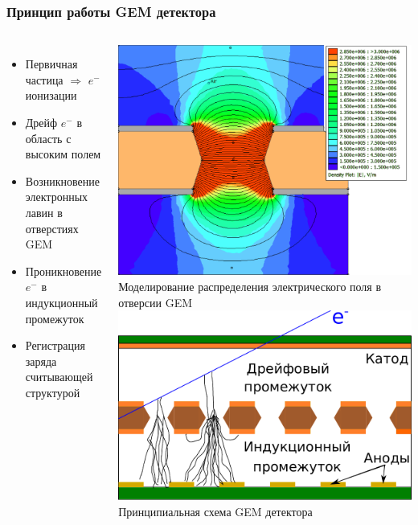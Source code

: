 \documentclass[14pt]{beamer}
\begin{document}
\begin{frame}[t]
\frametitle{Принцип работы GEM детектора}
\vspace{0pt}
\begin{columns}
\begin{minipage}[t][1\textheight]{\linewidth}
	\small{\begin{itemize}
			\item Первичная частица $\Rightarrow$ $e^-$ ионизации
			\item Дрейф $e^-$ в область с высоким полем
			\item Возникновение электронных лавин в отверстиях GEM
			\item Проникновение $e^-$ в индукционный промежуток
			\item Регистрация заряда считывающей структурой
	\end{itemize}}
\end{minipage}%
\begin{minipage}[t][1\textheight]{\linewidth}
	\hspace{1.5cm}\includegraphics[width=0.65\linewidth]{GEM_field.pdf}\\
	\centering \tiny{Моделирование распределения электрического поля в отверсии GEM}
	\vspace{-10pt}
	\center \includegraphics[width=0.9\linewidth]{GEM_scheme.pdf}
	\centering \tiny{Принципиальная схема GEM детектора}
\end{minipage}%
\end{columns}
\end{frame}
\end{document}
